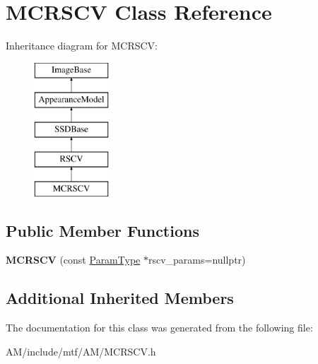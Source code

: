 \hypertarget{classMCRSCV}{\section{M\-C\-R\-S\-C\-V Class Reference}
\label{classMCRSCV}
}
Inheritance diagram for M\-C\-R\-S\-C\-V\-:\begin{figure}[H]
\begin{center}
\leavevmode
\includegraphics[height=5.000000cm]{classMCRSCV}
\end{center}
\end{figure}
\subsection*{Public Member Functions}
\begin{DoxyCompactItemize}
\item 
\hypertarget{classMCRSCV_a0faf7922d67d489e65afea48fcff59ea}{{\bfseries M\-C\-R\-S\-C\-V} (const \hyperlink{structRSCVParams}{Param\-Type} $\ast$rscv\-\_\-params=nullptr)}\label{classMCRSCV_a0faf7922d67d489e65afea48fcff59ea}

\end{DoxyCompactItemize}
\subsection*{Additional Inherited Members}


The documentation for this class was generated from the following file\-:\begin{DoxyCompactItemize}
\item 
A\-M/include/mtf/\-A\-M/M\-C\-R\-S\-C\-V.\-h\end{DoxyCompactItemize}
